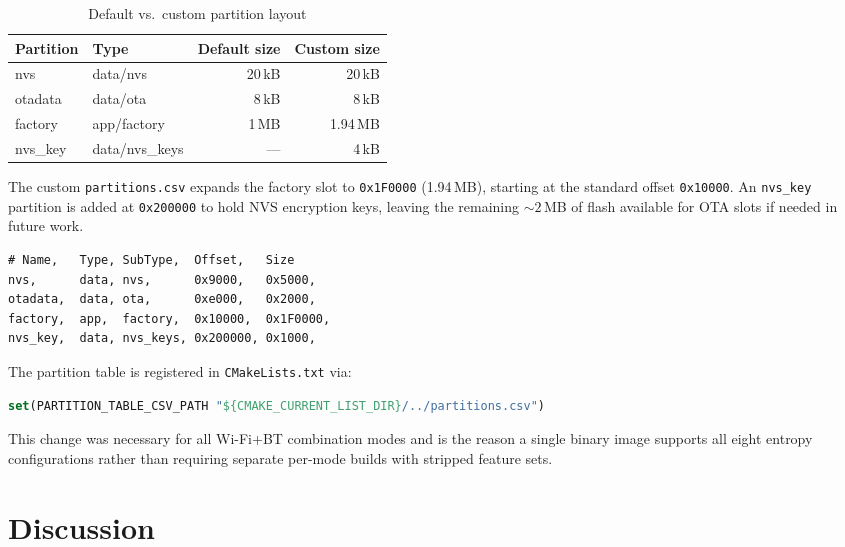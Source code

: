 \documentclass[10pt,twocolumn]{article}
\begin{document}
\begin{table}[h]
\centering
\caption{Default vs.\ custom partition layout}
\label{tab:default-partitions}
\begin{tabular}{llrr}
\toprule
Partition & Type & Default size & Custom size \\
\midrule
nvs      & data/nvs      & 20\,kB  & 20\,kB \\
otadata  & data/ota      &  8\,kB  &  8\,kB \\
factory  & app/factory   &  1\,MB  & 1.94\,MB \\
nvs\_key & data/nvs\_keys &  ---   &  4\,kB \\
\bottomrule
\end{tabular}
\end{table}

The custom \texttt{partitions.csv} expands the factory slot to
\texttt{0x1F0000} (1.94\,MB), starting at the standard offset
\texttt{0x10000}.
An \texttt{nvs\_key} partition is added at \texttt{0x200000} to hold
NVS encryption keys, leaving the remaining $\sim\!2$\,MB of flash
available for OTA slots if needed in future work.

\begin{lstlisting}[caption={partitions.csv --- custom partition table}]
# Name,   Type, SubType,  Offset,   Size
nvs,      data, nvs,      0x9000,   0x5000,
otadata,  data, ota,      0xe000,   0x2000,
factory,  app,  factory,  0x10000,  0x1F0000,
nvs_key,  data, nvs_keys, 0x200000, 0x1000,
\end{lstlisting}

The partition table is registered in \texttt{CMakeLists.txt} via:
\begin{lstlisting}[language=CMake,caption={Registering the custom partition table}]
set(PARTITION_TABLE_CSV_PATH "${CMAKE_CURRENT_LIST_DIR}/../partitions.csv")
\end{lstlisting}

This change was necessary for all Wi-Fi+BT combination modes and is the
reason a single binary image supports all eight entropy configurations
rather than requiring separate per-mode builds with stripped feature
sets.

\section{Discussion}
\end{document}

